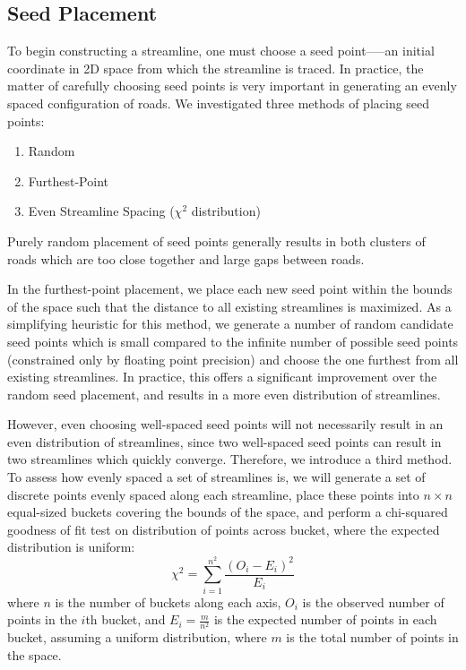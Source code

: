\documentclass[twocolumn]{article}
\begin{document}
\subsection{Seed Placement}\label{sec:seedpoints}
To begin constructing a streamline, one must choose a seed point—--an initial
coordinate in 2D space from which the streamline is traced. In practice, the
matter of carefully choosing seed points is very important in generating an
evenly spaced configuration of roads. We investigated three methods of placing
seed points:
\begin{enumerate}
    \item Random
    \item Furthest-Point
    \item Even Streamline Spacing ($\chi^2$ distribution)
\end{enumerate}

Purely random placement of seed points generally results in both clusters of
roads which are too close together and large gaps between roads.

In the furthest-point placement, we place each new seed point within the bounds
of the space such that the distance to all existing streamlines is maximized.
As a simplifying heuristic for this method, we generate a number of random
candidate seed points which is small compared to the infinite number of
possible seed points (constrained only by floating point precision) and choose
the one furthest from all existing streamlines. In practice, this offers a
significant improvement over the random seed placement, and results in a more
even distribution of streamlines.

However, even choosing well-spaced seed points will not necessarily result in
an even distribution of streamlines, since two well-spaced seed points can
result in two streamlines which quickly converge. Therefore, we introduce a
third method. To assess how evenly spaced a set of streamlines is, we will
generate a set of discrete points evenly spaced along each streamline, place
these points into $n\times n$ equal-sized buckets covering the bounds of the
space, and perform a chi-squared goodness of fit test on distribution of points
across bucket, where the expected distribution is uniform:
\[
    \chi^2 = \sum_{i=1}^{n^2} \frac{(O_i-E_i)^2}{E_i}
\]
where $n$ is the number of buckets along each axis, $O_i$ is the observed
number of points in the $i$th bucket, and $E_i=\frac{m}{n^2}$ is the
expected number of points in each bucket, assuming a uniform distribution,
where $m$ is the total number of points in the space.
\end{document}
